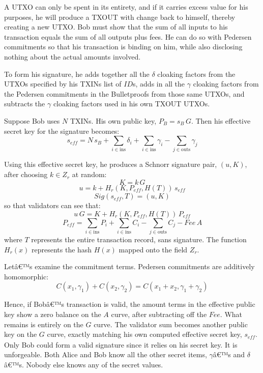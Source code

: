 \documentclass[8pt,fleqn,openany]{book}
\begin{document}
{		A UTXO can only be spent in its entirety, and if it carries excess value for his purposes, he will produce a TXOUT with change back to himself, thereby creating a new UTXO. Bob must show that the sum of all inputs to his transaction equals the sum of all outputs plus fees. He can do so with Pedersen commitments so that his transaction is binding on him, while also disclosing nothing about the actual amounts involved.
		
		To form his signature, he adds together all the $\delta$ cloaking factors from the UTXOs specified by his TXINs list of $\mathit{ID}$s, adds in all the $\gamma$ cloaking factors from the Pedersen commitments in the Bulletproofs from those same UTXOs, and subtracts the $\gamma$ cloaking factors used in his own TXOUT UTXOs. 
		
		Suppose Bob uses $N$ TXINs. His own public key, $P_B = s_B \, G$. Then his effective secret key for the signature becomes:
		$$s_{\mathit{eff}} = N \, s_B + \sum_{i \in \text{ins}} {\delta_i} + \sum_{i \in \text{ins}}{\gamma_i} - \sum_{j \in \text{outs}}{ \gamma_j}$$
		
		Using this effective secret key, he produces a Schnorr signature pair, $(u, K)$, after choosing $k \in Z_r$ at random:
		$$K = k \, G$$
		$$u = k + H_r(K, P_{eff}, H(T)) \, s_{\mathit{eff}}$$
		$$Sig(s_{eff},T) = (u, K)$$
		so that validators can see that:
		$$u \, G = K + H_r(K, P_{eff}, H(T)) \, P_{eff}$$
		$$P_{\mathit{eff}} = \sum_{i \in \text{ins}}{P_i} + \sum_{i \in \text{ins}}{C_i} - \sum_{j \in \text{outs}}{C_j} - \mathit{Fee} \, A$$
		where $T$ represents the entire transaction record, sans signature. The function $H_r(x)$ represents the hash $H(x)$ mapped onto the field $Z_r$.
		
		Letâ€™s examine the commitment terms. Pedersen commitments are additively homomorphic:
		$$C(x_1, \gamma_1) + C(x_2, \gamma_2) = C(x_1 + x_2, \gamma_1 + \gamma_2)$$
		
		Hence, if Bobâ€™s transaction is valid, the amount terms in the effective public key show a zero balance on the $A$ curve, after subtracting off the $\mathit{Fee}$. What remains is entirely on the $G$ curve. The validator sum becomes another public key on the $G$ curve, exactly matching his own computed effective secret key, $s_{\mathit{eff}}$. Only Bob could form a valid signature since it relies on his secret key. It is unforgeable. Both Alice and Bob know all the other secret items, $\gamma$â€™s and $\delta$â€™s. Nobody else knows any of the secret values.
		
}
\end{document}
